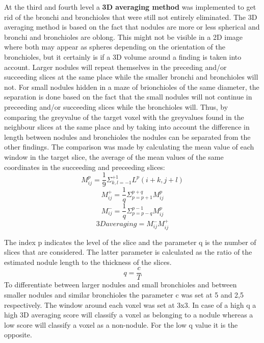 At the third and fourth level a \textbf{3D averaging method} \cite{keshani} was
implemented to get rid of the bronchi and bronchioles that were still not entirely eliminated. The
3D averaging method is based on the fact that nodules are more or less spherical
and bronchi and bronchioles are oblong. This might not be visible in a 2D image
where both may appear as spheres depending on the orientation of the
bronchioles, but it certainly is if a 3D volume around a finding is taken into account.
Larger nodules will repeat themselves in the preceding and/or succeeding slices
at the same place while the smaller bronchi and bronchioles will not. For small
nodules hidden in a maze of brionchioles of the same diameter, the separation is
done based on the fact that the small nodules will not continue in preceeding
and/or succeeding slices while the bronchioles will. Thus, by comparing the
greyvalue of the target voxel with the greyvalues found in the neighbour slices
at the same place and by taking into account the difference in length between
nodules and bronchioles the nodules can be separated from the other findings.
The comparison was made by calculating the mean value of each window in the
target slice, the average of the mean values of the same coordinates in the
succeeding and preceeding slices:
\begin{equation}
M_{ij}^p = \frac{1}{9} {\Sigma}_{k,l = -1}^{+1} L^p(i+k,j+l)
\end{equation}
\begin{equation}
M_{ij}^{+} = \frac{1}{q} {\Sigma}_{p=p+1}^{p+q} M^p_{ij}
\end{equation}
\begin{equation}
M_{ij}^{-} = \frac{1}{q} {\Sigma}_{p=p-q}^{p-1} M^p_{ij}
\end{equation}
\begin{equation}
3D averaging = M^{-}_{ij} M^{+}_{ij}
\end{equation}

The index p indicates the level of the slice and the parameter q is the number
of slices that are considered. The latter parameter is calculated as the ratio of the estimated nodule length to the
thickness of the slices.
\begin{equation}
q=\frac{c}{T}
\end{equation}
To differentiate between larger nodules and small bronchioles and between
smaller nodules and similar bronchioles the parameter c was set at 5 and 2,5
respectively. The window around each voxel was set at 3x3. In case of a high q a
high 3D averaging score will classify a voxel as belonging to a nodule whereas a
low score will classify a voxel as a non-nodule. For the low q value it is the
opposite.


